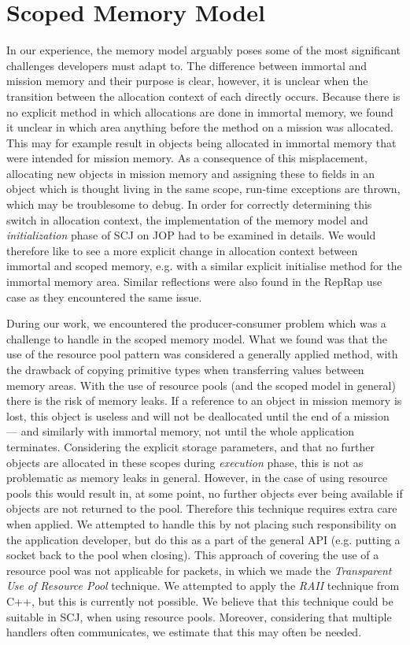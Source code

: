 \section{Scoped Memory Model} %
 \label{sec:scoped_memory_model}
In our experience, the memory model arguably poses some of the most significant challenges developers must adapt to. The difference between immortal and mission memory and their purpose is clear, however, it is unclear when the transition between the allocation context of each directly occurs. Because there is no explicit method in which allocations are done in immortal memory, we found it unclear in which area anything before the  method on a mission was allocated. This may for example result in objects being allocated in immortal memory that were intended for mission memory. As a consequence of this misplacement, allocating new objects in mission memory and assigning these to fields in an object which is thought living in the same scope, run-time exceptions are thrown, which may be troublesome to debug. In order for correctly determining this switch in allocation context, the implementation of the memory model and \textit{initialization} phase of SCJ on JOP had to be examined in details. We would therefore like to see a more explicit change in allocation context between immortal and scoped memory, e.g. with a similar explicit initialise method for the immortal memory area. Similar reflections were also found in the RepRap use case\cite{Schoeberl:2012:RepRap} as they encountered the same issue.

During our work, we encountered the producer-consumer problem which was a challenge to handle in the scoped memory model. What we found was that the use of the resource pool pattern was considered a generally applied method, with the drawback of copying primitive types when transferring values between memory areas. With the use of resource pools (and the scoped model in general) there is the risk of memory leaks. If a reference to an object in mission memory is lost, this object is useless and will not be deallocated until the end of a mission --- and similarly with immortal memory, not until the whole application terminates. Considering the explicit storage parameters, and that no further objects are allocated in these scopes during \textit{execution} phase, this is not as problematic as memory leaks in general. However, in the case of using resource pools this would result in, at some point, no further objects ever being available if objects are not returned to the pool. Therefore this technique requires extra care when applied. We attempted to handle this by not placing such responsibility on the application developer, but do this as a part of the general API (e.g. putting a socket back to the pool when closing). This approach of covering the use of a resource pool was not applicable for packets, in which we made the \textit{Transparent Use of Resource Pool} technique. We attempted to apply the \textit{RAII} technique from C++, but this is currently not possible. We believe that this technique could be suitable in SCJ, when using resource pools. Moreover, considering that multiple handlers often communicates, we estimate that this may often be needed.

